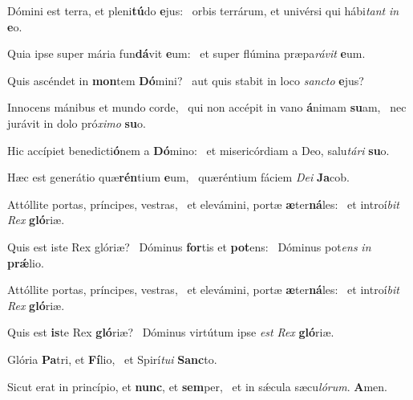 \item Dómini est terra, et pleni\textbf{tú}do \textbf{e}jus:~\psstar{} orbis terrárum, et univérsi qui hábi\textit{tant} \textit{in} \textbf{e}o.
\item Quia ipse super mária fun\textbf{dá}vit \textbf{e}um:~\psstar{} et super flúmina præpa\textit{rávit} \textbf{e}um.
\item Quis ascéndet in \textbf{mon}tem \textbf{Dó}mini?~\psstar{} aut quis stabit in loco \textit{sancto} \textbf{e}jus?
\item Innocens mánibus et mundo corde,~\pscross{} qui non accépit in vano \textbf{á}nimam \textbf{su}am,~\psstar{} nec jurávit in dolo pró\textit{ximo} \textbf{su}o.
\item Hic accípiet benedicti\textbf{ó}nem a \textbf{Dó}mino:~\psstar{} et misericórdiam a Deo, salu\textit{tári} \textbf{su}o.
\item Hæc est generátio quæ\textbf{rén}tium \textbf{e}um,~\psstar{} quæréntium fáciem \textit{Dei} \textbf{Ja}cob.
\item Attóllite portas, príncipes, vestras,~\pscross{} et elevámini, portæ \textbf{æ}ter\textbf{ná}les:~\psstar{} et introí\textit{bit} \textit{Rex} \textbf{gló}riæ.
\item Quis est iste Rex glóriæ?~\pscross{} Dóminus \textbf{for}tis et \textbf{pot}ens:~\psstar{} Dóminus pot\textit{ens} \textit{in} \textbf{prǽ}lio.
\item Attóllite portas, príncipes, vestras,~\pscross{} et elevámini, portæ \textbf{æ}ter\textbf{ná}les:~\psstar{} et introí\textit{bit} \textit{Rex} \textbf{gló}riæ.
\item Quis est \textbf{is}te Rex \textbf{gló}riæ?~\psstar{} Dóminus virtútum ipse \textit{est} \textit{Rex} \textbf{gló}riæ.
\item Glória \textbf{Pa}tri, et \textbf{Fí}lio,~\psstar{} et Spirí\textit{tui} \textbf{Sanc}to.
\item Sicut erat in princípio, et \textbf{nunc}, et \textbf{sem}per,~\psstar{} et in sǽcula sæcu\textit{lórum}. \textbf{A}men.